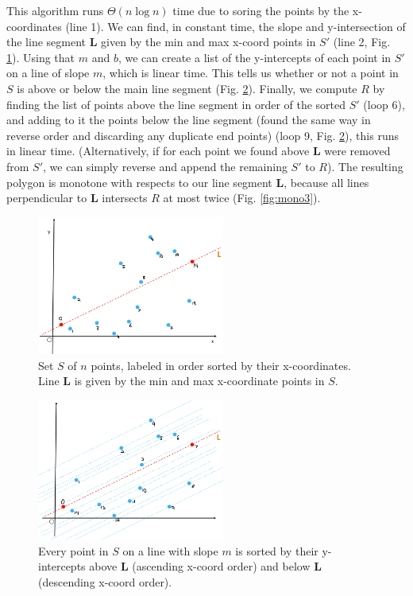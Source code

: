 \documentclass [12pt]{article}
\begin{document}
\begin{enumerate}[label=(\alph*)]
        This algorithm runs $\Theta(n\log n)$ time due to soring the points by the x-coordinates (line 1). We can find, in constant time, the slope and y-intersection of the line segment \textbf{L} given by the min and max x-coord points in $S'$ (line 2, Fig. \ref{fig:mono1}). Using that $m$ and $b$, we can create a list of the y-intercepts of each point in $S'$ on a line of slope $m$, which is linear time. This tells us whether or not a point in $S$ is above or below the main line segment (Fig. \ref{fig:mono2}). Finally, we compute $R$ by finding the list of points above the line segment in order of the sorted $S'$ (loop 6), and adding to it the points below the line segment (found the same way in reverse order and discarding any duplicate end points) (loop 9, Fig. \ref{fig:mono2}), this runs in linear time. (Alternatively, if for each point we found above \textbf{L} were removed from $S'$, we can simply reverse and append the remaining $S'$ to $R$). The resulting polygon is monotone with respects to our line segment \textbf{L}, because all lines perpendicular to \textbf{L} intersects $R$ at most twice (Fig. \ref{fig:mono3}).
    \end{enumerate}
        \pagebreak

        \begin{figure}[h] 
            \centering
            \includegraphics[width=0.55\textwidth]{images/monotonehull1.PNG}
            \caption{Set $S$ of $n$ points, labeled in order sorted by their x-coordinates. Line \textbf{L} is given by the min and max x-coordinate points in $S$.}
            \label{fig:mono1}
        \end{figure}

        \begin{figure}[h] 
            \centering
            \includegraphics[width=0.55\textwidth]{images/monotonehull2.PNG}
            \caption{Every point in $S$ on a line with slope $m$ is sorted by their y-intercepts above \textbf{L} (ascending x-coord order) and below \textbf{L} (descending x-coord order).}
            \label{fig:mono2}
        \end{figure}
        \pagebreak
\end{document}
